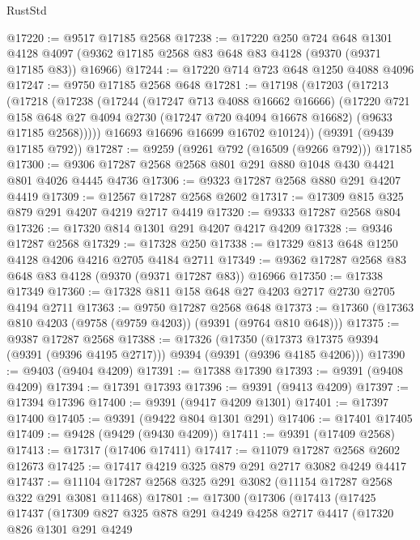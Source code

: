\begin{lexlean}{RustStd}
\begin{coremodule}
@17220 := @9517 @17185 @2568
@17238 := @17220
    @250
    @724
    @648
    @1301
    @4128
    @4097
    (@9362 @17185 @2568 @83 @648 @83 @4128 (@9370 (@9371 @17185 @83)) @16966)
@17244 := @17220 @714 @723 @648 @1250 @4088 @4096
@17247 := @9750 @17185 @2568 @648
@17281 := @17198
    (@17203
      (@17213
        (@17218
          (@17238
            (@17244
              (@17247 @713 @4088 @16662 @16666)
              (@17220
                @721
                @158
                @648
                @27
                @4094
                @2730
                (@17247 @720 @4094 @16678 @16682)
                (@9633 @17185 @2568)))))
        @16693
        @16696
        @16699
        @16702
        @10124))
    (@9391 (@9439 @17185 @792))
@17287 := @9259 (@9261 @792 (@16509 (@9266 @792))) @17185
@17300 := @9306 @17287 @2568 @2568 @801 @291 @880 @1048 @430 @4421 @801 @4026 @4445 @4736
@17306 := @9323 @17287 @2568 @880 @291 @4207 @4419
@17309 := @12567 @17287 @2568 @2602
@17317 := @17309 @815 @325 @879 @291 @4207 @4219 @2717 @4419
@17320 := @9333 @17287 @2568 @804
@17326 := @17320 @814 @1301 @291 @4207 @4217 @4209
@17328 := @9346 @17287 @2568
@17329 := @17328 @250
@17338 := @17329 @813 @648 @1250 @4128 @4206 @4216 @2705 @4184 @2711
@17349 := @9362 @17287 @2568 @83 @648 @83 @4128 (@9370 (@9371 @17287 @83)) @16966
@17350 := @17338 @17349
@17360 := @17328 @811 @158 @648 @27 @4203 @2717 @2730 @2705 @4194 @2711
@17363 := @9750 @17287 @2568 @648
@17373 := @17360 (@17363 @810 @4203 (@9758 (@9759 @4203)) (@9391 (@9764 @810 @648)))
@17375 := @9387 @17287 @2568
@17388 := @17326
    (@17350 (@17373 @17375 @9394 (@9391 (@9396 @4195 @2717))) @9394 (@9391 (@9396 @4185 @4206)))
@17390 := @9403 (@9404 @4209)
@17391 := @17388 @17390
@17393 := @9391 (@9408 @4209)
@17394 := @17391 @17393
@17396 := @9391 (@9413 @4209)
@17397 := @17394 @17396
@17400 := @9391 (@9417 @4209 @1301)
@17401 := @17397 @17400
@17405 := @9391 (@9422 @804 @1301 @291)
@17406 := @17401 @17405
@17409 := @9428 (@9429 (@9430 @4209))
@17411 := @9391 (@17409 @2568)
@17413 := @17317 (@17406 @17411)
@17417 := @11079 @17287 @2568 @2602 @12673
@17425 := @17417 @4219 @325 @879 @291 @2717 @3082 @4249 @4417
@17437 := @11104 @17287 @2568 @325 @291 @3082 (@11154 @17287 @2568 @322 @291 @3081 @11468)
@17801 := @17300
    (@17306
      (@17413
        (@17425
          @17437
          (@17309
            @827
            @325
            @878
            @291
            @4249
            @4258
            @2717
            @4417
            (@17320
              @826
              @1301
              @291
              @4249

\end{coremodule}
\end{lexlean}

